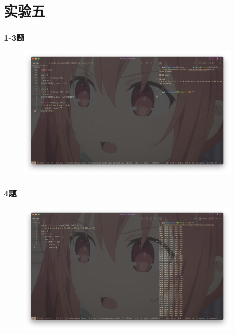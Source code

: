 \documentclass{beamer}
\begin{document}
  \section{实验五}
  \begin{frame}[fragile]
    \frametitle{1-3题}
    \begin{figure}[!htb] %
      \includegraphics[width=1\textwidth,height=0.8\textheight]{./graph/python-5.1-5.3.png} %
    \end{figure}
  \end{frame}
  \begin{frame}[fragile]
    \frametitle{4题}
    \begin{figure}[!htb] %
      \includegraphics[width=1\textwidth,height=0.8\textheight]{./graph/python-5.4.png} %
    \end{figure}
  \end{frame}
\end{document}

